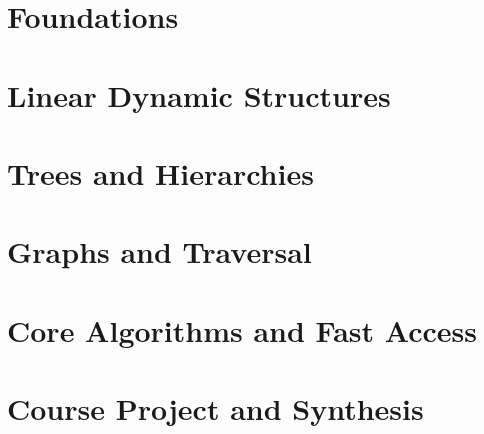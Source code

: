 \documentclass[11pt,oneside,a4paper]{report}
\begin{document}
\utpfrontmatter

\renewcommand{\thechapter}{1A}
\renewcommand{\theHchapter}{setup.1A}


\renewcommand{\thechapter}{1B}
\renewcommand{\theHchapter}{setup.1B}


\setcounter{chapter}{1}
\renewcommand{\thechapter}{\arabic{chapter}}
\renewcommand{\theHchapter}{\arabic{chapter}}

\part{Foundations}



\part{Linear Dynamic Structures}





\part{Trees and Hierarchies}



\part{Graphs and Traversal}


\part{Core Algorithms and Fast Access}



\part{Course Project and Synthesis}

\end{document}
